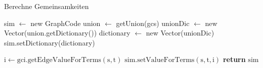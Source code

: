 \begin{algorithm}[htb]
\caption{Berechne Gemeinsamkeiten}
\label{sec3:model:par:mechanism-use-cases:alg:sim}
\begin{algorithmic}[1]
    \State sim $\gets$ new GraphCode
    \State union $\gets$ getUnion(gcs)
    \State unionDic $\gets$ new Vector(union.getDictionary())
        \State {}
    \EndFor
    \State dictionary $\gets$ new Vector(unionDic)
    \State sim.setDictionary(dictionary)
    
                \State $\text{i} \gets \text{gci.getEdgeValueForTerms}(\text{s}, \text{t})$
                \State $\text{sim.setValueForTerms}(\text{s}, \text{t}, \text{i})$
            \EndFor
        \EndFor
    \EndFor
    \State \textbf{return} $\text{sim}$
\EndFunction
\end{algorithmic}
\end{algorithm}